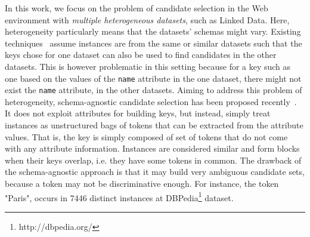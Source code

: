 In this work, we focus on the problem of candidate selection in the Web environment with \emph{multiple heterogeneous datasets}, such as Linked Data. Here, heterogeneity particularly means that the datasets' schemas might vary. Existing techniques~\cite{MichelsonK06} assume instances are from the same or similar datasets such that the keys chose for one dataset can also be used to find candidates in the other datasets. This is however problematic in this setting because for a key such as one based on the values of the \verb+name+ attribute in the one dataset, there might not exist the \verb+name+ attribute, in the other datasets. Aiming to address this problem of heterogeneity, schema-agnostic candidate selection has been proposed recently~\cite{papadakis_efficient_2011}. It does not exploit attributes for building keys, but instead, simply treat instances as unstructured bags of tokens that can be extracted from the attribute values. That is, the key is simply composed of set of tokens that do not come with any attribute information. Instances are considered similar and form blocks when their keys overlap, i.e. they have some tokens in common. The drawback of the schema-agnostic approach is that it may build very ambiguous candidate sets, because a token may not be discriminative enough. For instance, the token "Paris", occurs in 7446 distinct instances at DBPedia\footnote{http://dbpedia.org/} dataset. 


